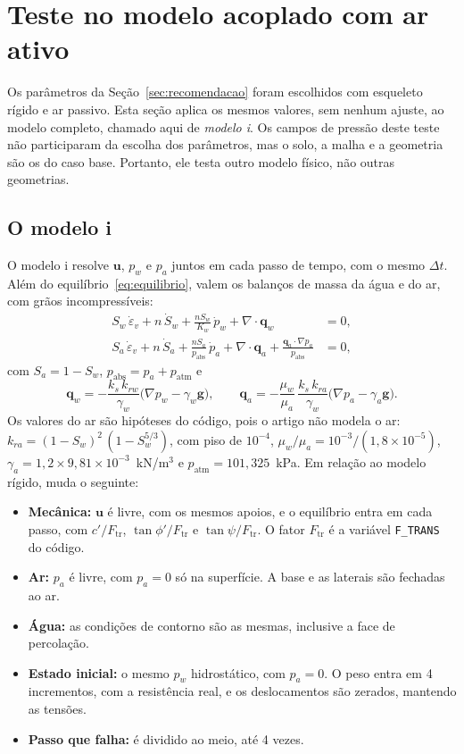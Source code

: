 \documentclass[11pt,a4paper]{article}
\numberwithin{equation}{section}
\begin{document}
\section{Teste no modelo acoplado com ar ativo}\label{sec:acoplado}

Os parâmetros da Seção~\ref{sec:recomendacao} foram escolhidos com esqueleto rígido e ar passivo. Esta seção aplica os mesmos valores, sem nenhum ajuste, ao modelo completo, chamado aqui de \emph{modelo i}. Os campos de pressão deste teste não participaram da escolha dos parâmetros, mas o solo, a malha e a geometria são os do caso base. Portanto, ele testa outro modelo físico, não outras geometrias.

\subsection{O modelo i}\label{sec:modelo_i}

O modelo i resolve $\mathbf{u}$, $p_w$ e $p_a$ juntos em cada passo de tempo, com o mesmo $\Delta t$. Além do equilíbrio~\eqref{eq:equilibrio}, valem os balanços de massa da água e do ar, com grãos incompressíveis:
\begin{align}
S_w\,\dot\varepsilon_v + n\,\dot S_w + \frac{n S_w}{K_w}\,\dot p_w + \nabla\cdot\mathbf{q}_w &= 0,\\
S_a\,\dot\varepsilon_v + n\,\dot S_a + \frac{n S_a}{p_{\mathrm{abs}}}\,\dot p_a + \nabla\cdot\mathbf{q}_a + \frac{\mathbf{q}_a\cdot\nabla p_a}{p_{\mathrm{abs}}} &= 0,
\end{align}
com $S_a = 1 - S_w$, $p_{\mathrm{abs}} = p_a + p_{\mathrm{atm}}$ e
\begin{equation}
\mathbf{q}_w = -\frac{k_s\,k_{rw}}{\gamma_w}\big(\nabla p_w - \gamma_w\mathbf{g}\big), \qquad
\mathbf{q}_a = -\frac{\mu_w}{\mu_a}\,\frac{k_s\,k_{ra}}{\gamma_w}\big(\nabla p_a - \gamma_a\mathbf{g}\big).
\end{equation}
Os valores do ar são hipóteses do código, pois o artigo não modela o ar: $k_{ra} = (1 - S_w)^2\,(1 - S_w^{5/3})$, com piso de $10^{-4}$, $\mu_w/\mu_a = 10^{-3}/(1{,}8\times10^{-5})$, $\gamma_a = 1{,}2\times 9{,}81\times 10^{-3}$~kN/m$^3$ e $p_{\mathrm{atm}} = 101{,}325$~kPa. Em relação ao modelo rígido, muda o seguinte:
\begin{itemize}
\item \textbf{Mecânica:} $\mathbf{u}$ é livre, com os mesmos apoios, e o equilíbrio entra em cada passo, com $c'/F_{\mathrm{tr}}$, $\tan\phi'/F_{\mathrm{tr}}$ e $\tan\psi/F_{\mathrm{tr}}$. O fator $F_{\mathrm{tr}}$ é a variável \texttt{F\_TRANS} do código.
\item \textbf{Ar:} $p_a$ é livre, com $p_a = 0$ só na superfície. A base e as laterais são fechadas ao ar.
\item \textbf{Água:} as condições de contorno são as mesmas, inclusive a face de percolação.
\item \textbf{Estado inicial:} o mesmo $p_w$ hidrostático, com $p_a = 0$. O peso entra em 4 incrementos, com a resistência real, e os deslocamentos são zerados, mantendo as tensões.
\item \textbf{Passo que falha:} é dividido ao meio, até 4 vezes.
\end{itemize}
\end{document}
